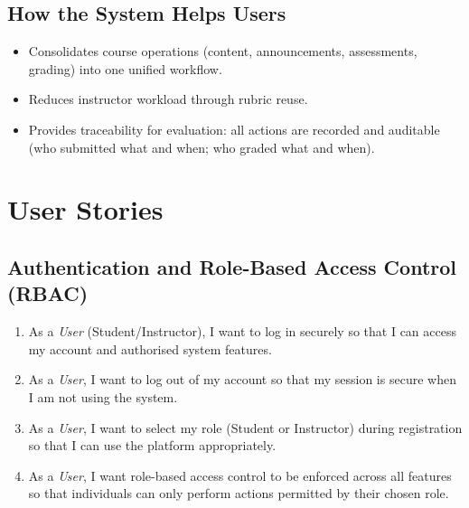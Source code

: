 \documentclass[12pt, a4paper]{article}
\begin{document}
\subsection{How the System Helps Users}
\begin{itemize}
  \item Consolidates course operations (content, announcements, assessments,
        grading) into one unified workflow.
  \item Reduces instructor workload through rubric reuse.
  \item Provides traceability for evaluation: all actions are recorded and
        auditable (who submitted what and when; who graded what and when).
\end{itemize}

\section{User Stories}

\subsection{Authentication and Role-Based Access Control (RBAC)}
\begin{enumerate}[label=\textbf{US\,\arabic*}]
  \item As a \emph{User} (Student/Instructor), I want to log in securely so
        that I can access my account and authorised system features.
  \item As a \emph{User}, I want to log out of my account so that my session
        is secure when I am not using the system.
  \item As a \emph{User}, I want to select my role (Student or Instructor)
        during registration so that I can use the platform appropriately.
  \item As a \emph{User}, I want role-based access control to be enforced
        across all features so that individuals can only perform actions
        permitted by their chosen role.
\end{enumerate}
\end{document}

